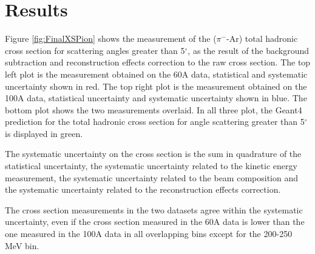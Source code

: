 \section{Results}\label{ch:FinalPion}
Figure \ref{fig:FinalXSPion} shows the measurement of the ($\pi^-$-Ar) total hadronic cross section for  scattering angles greater than 5$^\circ$, as the result of the background subtraction and reconstruction effects correction to the raw cross section. The top left plot is the measurement obtained on the 60A data, statistical and systematic uncertainty shown in red. The top right plot is the measurement obtained on the 100A data, statistical uncertainty and systematic uncertainty shown in blue. The bottom plot shows the two measurements overlaid. In all three plot, the Geant4 prediction for the total hadronic cross section for angle scattering greater than 5$^\circ$ is displayed in green. 

The systematic uncertainty on the cross section is the sum in quadrature of the statistical uncertainty, the systematic uncertainty related to the kinetic energy measurement, the systematic uncertainty related to the beam composition and the systematic uncertainty related to the reconstruction effects correction.

The cross section measurements in the two datasets agree within the systematic uncertainty, even if the cross section measured in the 60A data is lower than the one measured in the 100A data in all overlapping bins except for the 200-250 MeV bin.

